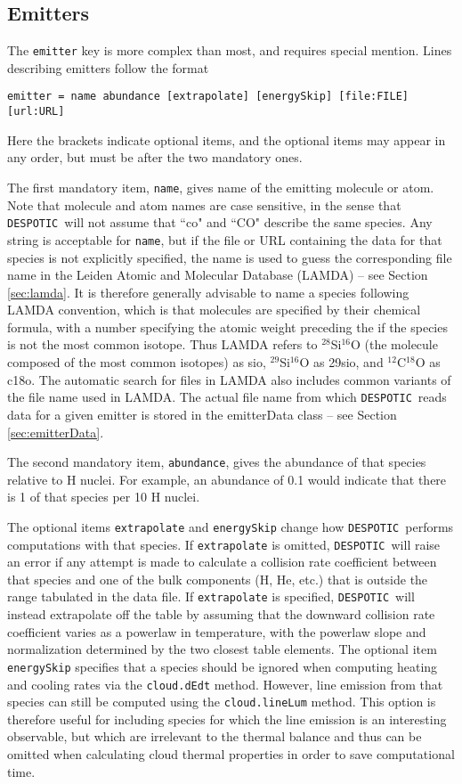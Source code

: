 \documentclass[12pt]{article}
\newcommand{\despotic}{\texttt{DESPOTIC}}
\begin{document}
\subsection{Emitters}
\label{sec:cloudfiles_emitters}

The \verb=emitter= key is more complex than most, and requires special mention. Lines describing emitters follow the format
\begin{verbatim}
emitter = name abundance [extrapolate] [energySkip] [file:FILE] [url:URL]
\end{verbatim}
Here the brackets indicate optional items, and the optional items may appear in any order, but must be after the two mandatory ones.

The first mandatory item, \verb=name=, gives name of the emitting molecule or atom. Note that molecule and atom names are case sensitive, in the sense that \despotic\ will not assume that ``co" and ``CO" describe the same species. Any string is acceptable for \verb=name=, but if the file or URL containing the data for that species is not explicitly specified, the name is used to guess the corresponding file name in the Leiden Atomic and Molecular Database (LAMDA) -- see Section \ref{sec:lamda}. It is therefore generally advisable to name a species following LAMDA convention, which is that molecules are specified by their chemical formula, with a number specifying the atomic weight preceding the if the species is not the most common isotope. Thus LAMDA refers to $^{28}$Si$^{16}$O (the molecule composed of the most common isotopes) as sio, $^{29}$Si$^{16}$O as 29sio, and $^{12}$C$^{18}$O as c18o. The automatic search for files in LAMDA also includes common variants of the file name used in LAMDA. The actual file name from which \despotic\ reads data for a given emitter is stored in the emitterData class -- see Section \ref{sec:emitterData}.

The second mandatory item, \verb=abundance=, gives the abundance of that species relative to H nuclei. For example, an abundance of 0.1 would indicate that there is 1 of that species per 10 H nuclei.

The optional items \verb=extrapolate= and \verb=energySkip= change how \despotic\ performs computations with that species. If \verb=extrapolate= is omitted, \despotic\ will raise an error if any attempt is made to calculate a collision rate coefficient between that species and one of the bulk components (H, He, etc.) that is outside the range tabulated in the data file. If \verb=extrapolate= is specified, \despotic\ will instead extrapolate off the table by assuming that the downward collision rate coefficient varies as a powerlaw in temperature, with the powerlaw slope and normalization determined by the two closest table elements. The optional item \verb=energySkip= specifies that a species should be ignored when computing heating and cooling rates via the \verb=cloud.dEdt= method. However, line emission from that species can still be computed using the \verb=cloud.lineLum= method. This option is therefore useful for including species for which the line emission is an interesting observable, but which are irrelevant to the thermal balance and thus can be omitted when calculating cloud thermal properties in order to save computational time.
\end{document}
